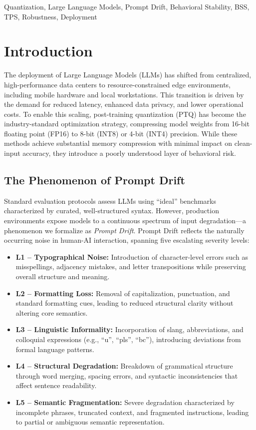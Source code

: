 \documentclass[conference]{IEEEtran}
\begin{document}
\begin{IEEEkeywords}
Quantization, Large Language Models, Prompt Drift, Behavioral Stability, BSS, TPS, Robustness, Deployment
\end{IEEEkeywords}

\section{Introduction}

The deployment of Large Language Models (LLMs) has shifted from centralized, high-performance data centers to resource-constrained edge environments, including mobile hardware and local workstations. This transition is driven by the demand for reduced latency, enhanced data privacy, and lower operational costs. To enable this scaling, post-training quantization (PTQ) has become the industry-standard optimization strategy, compressing model weights from 16-bit floating point (FP16) to 8-bit (INT8) or 4-bit (INT4) precision. While these methods achieve substantial memory compression with minimal impact on clean-input accuracy, they introduce a poorly understood layer of behavioral risk.

\subsection{The Phenomenon of Prompt Drift}

Standard evaluation protocols assess LLMs using ``ideal'' benchmarks characterized by curated, well-structured syntax. However, production environments expose models to a continuous spectrum of input degradation—a phenomenon we formalize as \textit{Prompt Drift}. Prompt Drift reflects the naturally occurring noise in human-AI interaction, spanning five escalating severity levels:

\begin{itemize}
\item \textbf{L1 – Typographical Noise:} Introduction of character-level errors such as misspellings, adjacency mistakes, and letter transpositions while preserving overall structure and meaning.
\item \textbf{L2 – Formatting Loss:} Removal of capitalization, punctuation, and standard formatting cues, leading to reduced structural clarity without altering core semantics.
\item \textbf{L3 – Linguistic Informality:} Incorporation of slang, abbreviations, and colloquial expressions (e.g., ``u'', ``pls'', ``bc''), introducing deviations from formal language patterns.
\item \textbf{L4 – Structural Degradation:} Breakdown of grammatical structure through word merging, spacing errors, and syntactic inconsistencies that affect sentence readability.
\item \textbf{L5 – Semantic Fragmentation:} Severe degradation characterized by incomplete phrases, truncated context, and fragmented instructions, leading to partial or ambiguous semantic representation.
\end{itemize}
\end{document}
